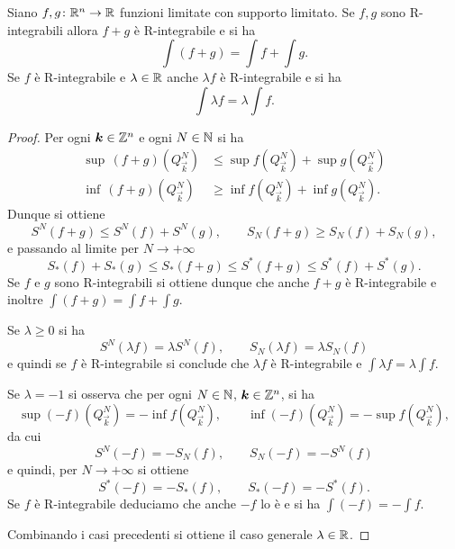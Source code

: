 \begin{theorem}
Siano $f,g\colon {\mathbb R}^n \to {\mathbb R}$ funzioni limitate con supporto limitato.
Se $f,g$ sono R-integrabili allora $f+g$ è R-integrabile e si ha 
\[
    \int (f+g) = \int f + \int g.
\]
Se $f$ è R-integrabile e $\lambda\in {\mathbb R}$ anche $\lambda f$ è R-integrabile 
e si ha 
\[
    \int \lambda f = \lambda \int f.
\]
\end{theorem}
\begin{proof}
Per ogni $\boldsymbol k\in{\mathbb Z}^n$ e ogni $N\in {\mathbb N}$
si ha
\begin{align*}
  \sup\, (f+g)(Q^N_{\vec k}) &\le \sup f(Q^N_{\vec k}) + \sup g(Q^N_{\vec k})\\
  \inf\, (f+g)(Q^N_{\vec k}) &\ge \inf f(Q^N_{\vec k}) + \inf g(Q^N_{\vec k}).
\end{align*}
Dunque si ottiene
\[
    S^N(f+g) \le S^N(f) + S^N(g),  \qquad
    S_N(f+g) \ge S_N(f) + S_N(g), 
\]
e passando al limite per $N\to +\infty$ 
\[
   S_*(f) + S_*(g) \le S_*(f+g) \le S^*(f+g) \le S^*(f) + S^*(g).
\]
Se $f$ e $g$ sono R-integrabili si ottiene dunque che anche $f+g$ 
è R-integrabile e inoltre $\int (f+g) = \int f + \int g$.

Se $\lambda \ge 0$ si ha 
\[
   S^N(\lambda f) = \lambda S^N(f), \qquad S_N(\lambda f) = \lambda S_N(f)
\]
e quindi se $f$ è R-integrabile si conclude 
che $\lambda f$ è R-integrabile e $\int \lambda f = \lambda \int f$.

Se $\lambda = -1$ si osserva che per ogni $N\in {\mathbb N}$, $\boldsymbol k\in {\mathbb Z}^n$, 
si ha 
\[
   \sup (-f)(Q^N_{\vec k}) = -\inf f(Q^N_{\vec k}),
   \qquad 
   \inf (-f)(Q^N_{\vec k}) = -\sup f(Q^N_{\vec k}),
\]
da cui 
\[
    S^N(-f) = -S_N(f), \qquad S_N(-f) = -S^N(f)
\]
e quindi, per $N\to +\infty$ si ottiene 
\[
  S^*(-f) = -S_*(f), \qquad S_*(-f) = - S^*(f).
\]
Se $f$ è R-integrabile deduciamo che anche $-f$ lo è e si ha 
$\int (-f) = -\int f$.

Combinando i casi precedenti si ottiene il caso generale $\lambda \in {\mathbb R}$.
\end{proof}

